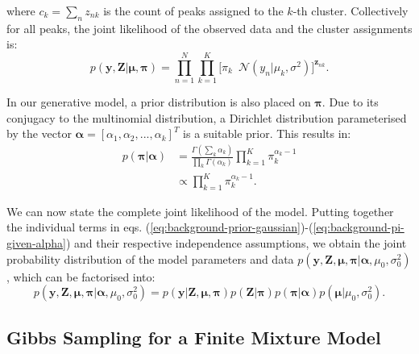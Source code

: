 where $c_{k} = \sum_n z_{nk}$ is the count of peaks assigned to the $k$-th cluster. Collectively for all peaks, the joint likelihood of the observed data and the cluster assignments is:
\begin{equation}
p(\boldsymbol{y},\boldsymbol{Z}  \vert \boldsymbol{\mu},\boldsymbol{\pi}) = \prod_{n=1}^{N} \prod_{k=1}^{K} \big[ \pi_k \enspace \mathcal{N}(y_n \vert \mu_k,\sigma^2) \big]^{\boldsymbol{z}_{nk}}.
\label{eq:background-mixture-likelihood}
\end{equation}

In our generative model, a prior distribution is also placed on $\boldsymbol{\pi}$. Due to its conjugacy to the multinomial distribution, a Dirichlet distribution parameterised by the vector $\boldsymbol{\alpha}=[\alpha_1,\alpha_2,...,\alpha_k]^T$ is a suitable prior. This results in:
\begin{equation}
\begin{aligned}
p(\boldsymbol{\pi} \vert \boldsymbol{\alpha}) &= \frac{\Gamma(\sum_{k} \alpha_{k})}{\prod_{k} \Gamma(\alpha_k)}  \prod_{k=1}^{K} \pi_k^{\alpha_{k}-1} \\
                                                                      &\propto \prod_{k=1}^{K} \pi_k^{\alpha_{k}-1}.
\end{aligned}
\label{eq:background-pi-given-alpha}
\end{equation}

We can now state the complete joint likelihood of the model. Putting together the individual terms in eqs. (\ref{eq:background-prior-gaussian})-(\ref{eq:background-pi-given-alpha}) and their respective independence assumptions, we obtain the joint probability distribution of the model parameters and data $p(\boldsymbol{y}, \boldsymbol{Z}, \boldsymbol{\mu}, \boldsymbol{\pi} \vert \boldsymbol{\alpha}, \allowbreak \mu_0,\sigma_0^2)$, which can be factorised into: 
\begin{equation}
p(\boldsymbol{y}, \boldsymbol{Z}, \boldsymbol{\mu}, \boldsymbol{\pi} \vert \boldsymbol{\alpha},\mu_0,\sigma_0^2) = p(\boldsymbol{y} \vert \boldsymbol{Z}, \boldsymbol{\mu},\boldsymbol{\pi}) p(\boldsymbol{Z} \vert \boldsymbol{\pi}) p(\boldsymbol{\pi} \vert \boldsymbol{\alpha}) p(\boldsymbol{\mu} \vert \mu_0, \sigma_0^2).
\label{eq:example-full-joint-dist}
\end{equation}

\subsection{Gibbs Sampling for a Finite Mixture Model}

